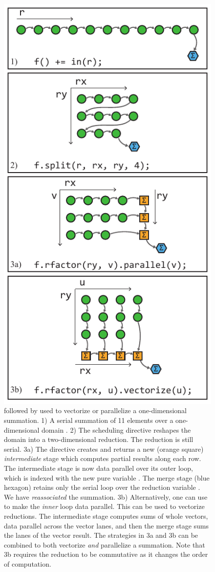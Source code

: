 \begin{figure}
\centering
\includegraphics[width=0.9\columnwidth]{rfactor}
\caption{%
   followed by  used to vectorize or parallelize a one-dimensional summation. 1) A serial summation of 11 elements over a one-dimensional domain . 2) The  scheduling directive reshapes the domain into a two-dimensional reduction. The reduction is still serial. 3a) The  directive creates and returns a new (orange square) \emph{intermediate} stage which computes partial results along each row. The intermediate stage is now data parallel over its outer loop, which is indexed with the new pure variable . The merge stage (blue hexagon) retains only the serial loop over the reduction variable . We have \emph{reassociated} the summation. 3b) Alternatively, one can use  to make the \emph{inner} loop data parallel. This can be used to vectorize reductions. The intermediate stage computes sums of whole vectors, data parallel across the vector lanes, and then the merge stage sums the lanes of the vector result. The strategies in 3a and 3b can be combined to both vectorize \emph{and} parallelize a summation. Note that 3b requires the reduction to be commutative as it changes the order of computation.
}
\end{figure}
